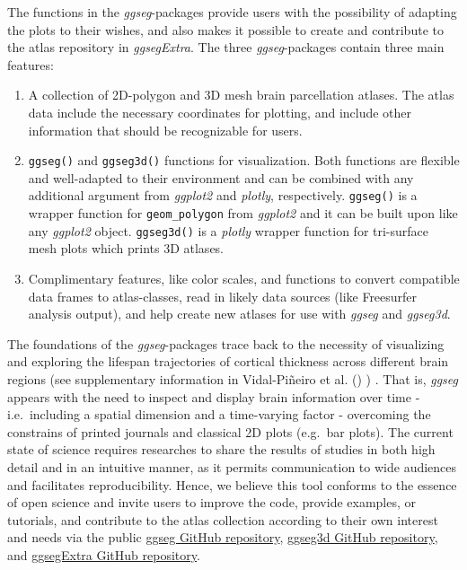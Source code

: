 \documentclass[fleqn,10pt]{wlpeerj} %
\providecommand{\tightlist}{
\setlength{\itemsep}{0pt}\setlength{\parskip}{0pt}}
\begin{document}
The functions in the \emph{ggseg}-packages provide users with the possibility of adapting the plots to their wishes, and also makes it possible to create and contribute to the atlas repository in \emph{ggsegExtra}.
The three \emph{ggseg}-packages contain three main features:

\begin{enumerate}
\def\labelenumi{\arabic{enumi}.}
\tightlist
\item
  A collection of 2D-polygon and 3D mesh brain parcellation atlases. The atlas data include the necessary coordinates for plotting, and include other information that should be recognizable for users.\\
\item
  \texttt{ggseg()} and \texttt{ggseg3d()} functions for visualization. Both functions are flexible and well-adapted to their environment and can be combined with any additional argument from \emph{ggplot2} and \emph{plotly}, respectively.
  \texttt{ggseg()} is a wrapper function for \texttt{geom\_polygon} from \emph{ggplot2} and it can be built upon like any \emph{ggplot2} object.
  \texttt{ggseg3d()} is a \emph{plotly} wrapper function for tri-surface mesh plots which prints 3D atlases.\\
\item
  Complimentary features, like color scales, and functions to convert compatible data frames to atlas-classes, read in likely data sources (like Freesurfer analysis output), and help create new atlases for use with \emph{ggseg} and \emph{ggseg3d}.
\end{enumerate}

The foundations of the \emph{ggseg}-packages trace back to the necessity of visualizing and exploring the lifespan trajectories of cortical thickness across different brain regions (see supplementary information in Vidal-Piñeiro et al. (\citeyearpar{vidal_2019}) ) .
That is, \emph{ggseg} appears with the need to inspect and display brain information over time - i.e.~including a spatial dimension and a time-varying factor - overcoming the constrains of printed journals and classical 2D plots (e.g.~bar plots).
The current state of science requires researches to share the results of studies in both high detail and in an intuitive manner, as it permits communication to wide audiences and facilitates reproducibility.
Hence, we believe this tool conforms to the essence of open science and invite users to improve the code, provide examples, or tutorials, and contribute to the atlas collection according to their own interest and needs via the public \href{https://github.com/LCBC-UiO/ggseg}{ggseg GitHub repository}, \href{https://github.com/LCBC-UiO/ggseg3d}{ggseg3d GitHub repository}, and \href{https://github.com/LCBC-UiO/ggsegExtra}{ggsegExtra GitHub repository}.
\end{document}
